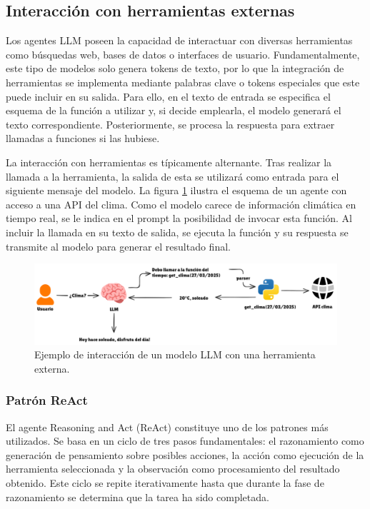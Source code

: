 \subsection{Interacción con herramientas externas}
Los agentes LLM poseen la capacidad de interactuar con diversas herramientas como búsquedas web, bases de datos o interfaces de usuario. Fundamentalmente, este tipo de modelos solo genera tokens de texto, por lo que la integración de herramientas se implementa mediante palabras clave o tokens especiales que este puede incluir en su salida. Para ello, en el texto de entrada se especifica el esquema de la función a utilizar y, si decide emplearla, el modelo generará el texto correspondiente. Posteriormente, se procesa la respuesta para extraer llamadas a funciones si las hubiese.

La interacción con herramientas es típicamente alternante. Tras realizar la llamada a la herramienta, la salida de esta se utilizará como entrada para el siguiente mensaje del modelo. La figura \ref{fig:herramientas} ilustra el esquema de un agente con acceso a una API del clima. Como el modelo carece de información climática en tiempo real, se le indica en el prompt la posibilidad de invocar esta función. Al incluir la llamada en su texto de salida, se ejecuta la función y su respuesta se transmite al modelo para generar el resultado final.

\begin{figure}[H]
  \centering
  \hspace{-3.60cm}\includegraphics[width=1.25\linewidth]{figures/herramienta.png}
  \caption{Ejemplo de interacción de un modelo LLM con una herramienta externa.}
  \label{fig:herramientas}
\end{figure}


\subsubsection{Patrón ReAct}
El agente Reasoning and Act (ReAct) constituye uno de los patrones más utilizados\cite{yao_react_2023}. Se basa en un ciclo de tres pasos fundamentales: el razonamiento como generación de pensamiento sobre posibles acciones, la acción como ejecución de la herramienta seleccionada y la observación como procesamiento del resultado obtenido. Este ciclo se repite iterativamente hasta que durante la fase de razonamiento se determina que la tarea ha sido completada.

